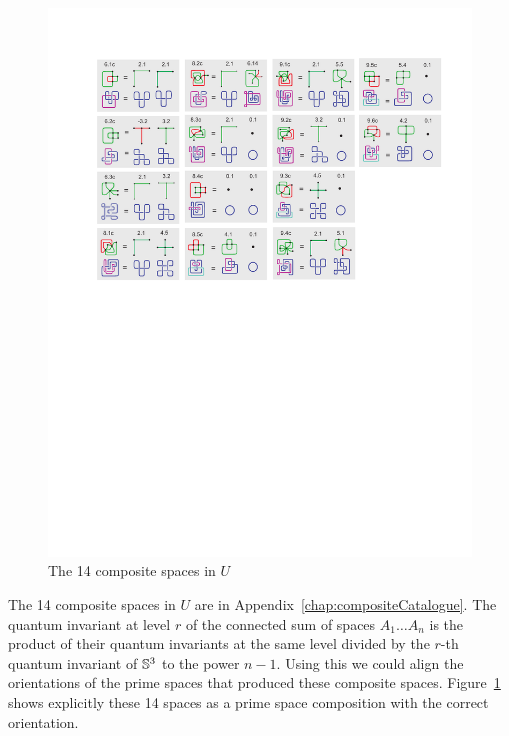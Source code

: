 \begin{figure}[h!tp]
   \begin{center}
      \leavevmode
      \includegraphics[width=16cm]{fig/compositeSpaces.pdf}
   \end{center}
   \vspace{-0.7cm}
   \caption{ The 14 composite spaces in $U$}
   \label{fig:compositeSpaces}
\end{figure}

The 14 composite spaces in $U$ are in Appendix~\ref{chap:compositeCatalogue}.
The quantum invariant at level $r$ of the connected sum of spaces $A_1 \ldots A_n$ is the product
of their quantum invariants at the same level divided by the $r$-th quantum invariant of $\mathbb{S}^3$ to
the power $n-1$. Using this we could align the orientations of the prime spaces that
produced these composite spaces. Figure~\ref{fig:compositeSpaces} shows explicitly these
14 spaces as a prime space composition with the correct orientation.

